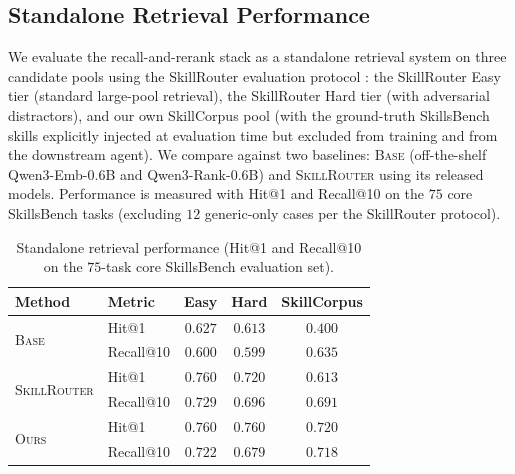 \subsection{Standalone Retrieval Performance}
\label{app:retrieval-perf}

We evaluate the recall-and-rerank stack as a standalone retrieval
system on three candidate pools using the SkillRouter evaluation
protocol \citep{SkillRouter2026}: the SkillRouter Easy tier
(standard large-pool retrieval), the SkillRouter Hard tier (with
adversarial distractors), and our own SkillCorpus pool (with
the ground-truth SkillsBench skills explicitly injected at
evaluation time but excluded from training and from the
downstream agent).  We compare against two baselines:
\textsc{Base} (off-the-shelf Qwen3-Emb-0.6B and Qwen3-Rank-0.6B)
and \textsc{SkillRouter} \citep{SkillRouter2026} using its
released models.  Performance is measured with Hit@1 and
Recall@10 on the $75$ core SkillsBench tasks (excluding $12$
generic-only cases per the SkillRouter protocol).

\begin{table}[!ht]
\centering\small
\setlength{\tabcolsep}{4pt}
\begin{tabular}{@{}llccc@{}}
\toprule
Method & Metric & Easy & Hard & SkillCorpus \\
\midrule
\multirow{2}{*}{\textsc{Base}}
                             & Hit@1     & $0.627$ & $0.613$ & $0.400$ \\
                             & Recall@10 & $0.600$ & $0.599$ & $0.635$ \\
\midrule
\multirow{2}{*}{\textsc{SkillRouter}}
                             & Hit@1     & $\mathbf{0.760}$ & $0.720$ & $0.613$ \\
                             & Recall@10 & $\mathbf{0.729}$ & $\mathbf{0.696}$ & $0.691$ \\
\midrule
\multirow{2}{*}{\textsc{Ours}}
                             & Hit@1     & $\mathbf{0.760}$ & $\mathbf{0.760}$ & $\mathbf{0.720}$ \\
                             & Recall@10 & $0.722$ & $0.679$ & $\mathbf{0.718}$ \\
\bottomrule
\end{tabular}
\caption{Standalone retrieval performance (Hit@1 and Recall@10
on the $75$-task core SkillsBench evaluation set).}
\label{tab:skill_routing_performance}
\end{table}

